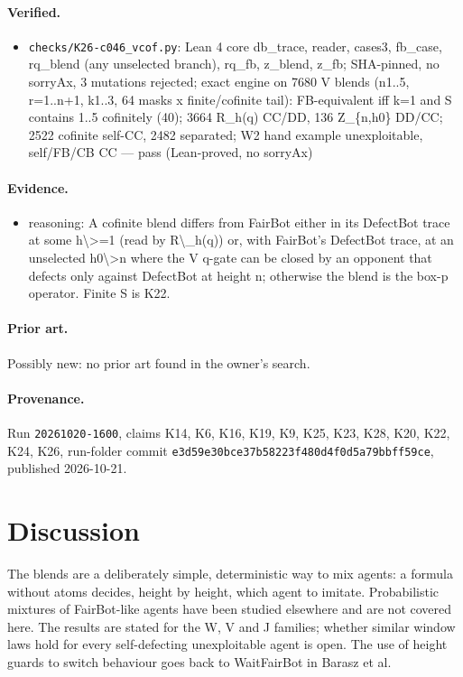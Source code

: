 \documentclass{article}
\begin{document}
\paragraph{Verified.}
\begin{itemize}
\item \texttt{checks/K26-c046\_vcof.py}: Lean 4 core db\_trace, reader, cases3, fb\_case, rq\_blend (any unselected branch), rq\_fb, z\_blend, z\_fb; SHA-pinned, no sorryAx, 3 mutations rejected; exact engine on 7680 V blends (n1..5, r=1..n+1, k1..3, 64 masks x finite/cofinite tail): FB-equivalent iff k=1 and S contains 1..5 cofinitely (40); 3664 R\_h(q) CC/DD, 136 Z\_\{n,h0\} DD/CC; 2522 cofinite self-CC, 2482 separated; W2 hand example unexploitable, self/FB/CB CC --- pass (Lean-proved, no sorryAx)
\end{itemize}

\paragraph{Evidence.}
\begin{itemize}
\item reasoning: A cofinite blend differs from FairBot either in its DefectBot trace at some h\textbackslash{}\textgreater{}=1 (read by R\textbackslash{}\_h(q)) or, with FairBot's DefectBot trace, at an unselected h0\textbackslash{}\textgreater{}n where the V q-gate can be closed by an opponent that defects only against DefectBot at height n; otherwise the blend is the box-p operator. Finite S is K22.
\end{itemize}

\paragraph{Prior art.} Possibly new: no prior art found in the owner's search.


\paragraph{Provenance.}
Run \texttt{20261020-1600}, claims K14, K6, K16, K19, K9, K25, K23, K28, K20, K22, K24, K26, run-folder commit \texttt{e3d59e30bce37b58223f480d4f0d5a79bbff59ce}, published 2026-10-21.

\section{Discussion}

The blends are a deliberately simple, deterministic way to mix agents: a formula without atoms
decides, height by height, which agent to imitate. Probabilistic mixtures of FairBot-like agents
have been studied elsewhere \cite{oesterheld2022compatibility} and are not covered here. The results
are stated for the W, V and J families; whether similar window laws hold for every
self-defecting unexploitable agent is open. The use of height guards to switch behaviour goes
back to WaitFairBot in Barasz et al.
\end{document}
